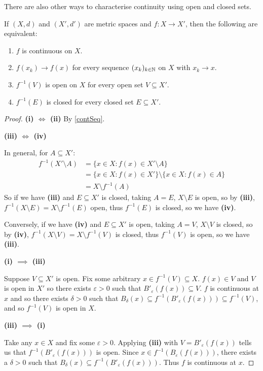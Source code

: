 \documentclass[../main.tex]{subfiles}
\begin{document}
There are also other ways to characterise continuity using open and closed sets.
\begin{theorem}
  If $(X, d)$ and $(X', d')$ are metric spaces and $f: X \to X'$, then the following are equivalent:
  \begin{enumerate}
    \item $f$ is continuous on $X$.
    \item $f(x_k) \to f(x)$ for every sequence $(x_k)_{k \in \mathbb{N}}$ on $X$ with $x_k \to x$.
    \item $f^{-1}(V)$ is open on $X$ for every open set $V \subseteq X'$.
    \item $f^{-1}(E)$ is closed for every closed set $E \subseteq X'$.
  \end{enumerate}
\end{theorem}
\begin{proof}\par
  \textbf{(i) $\iff$ (ii)} By \cref{contSeq}.

  \textbf{(iii) $\iff$ (iv)}\par
  In general, for $A \subseteq X'$:
  \begin{align*}
    f^{-1}(X' \setminus A) &= \{x \in X: f(x) \in X' \setminus A\} \\
                           &= \{x \in X: f(x) \in X'\} \setminus \{x \in X: f(x) \in A\} \\
                           &= X \setminus f^{-1}(A)
  \end{align*}
  So if we have \textbf{(iii)} and $E \subseteq X'$ is closed, taking $A = E$, $X \setminus E$ is open, so by \textbf{(iii)}, $f^{-1}(X \setminus E) = X \setminus f^{-1}(E)$ open, thus $f^{-1}(E)$ is closed, so we have \textbf{(iv)}.

  Conversely, if we have \textbf{(iv)} and $E \subseteq X'$ is open, taking $A = V$, $X \setminus V$ is closed, so by \textbf{(iv)}, $f^{-1}(X \setminus V) = X \setminus f^{-1}(V)$ is closed, thus $f^{-1}(V)$ is open, so we have \textbf{(iii)}.

  \textbf{(i) $\implies$ (iii)}\par
  Suppose $V \subseteq X'$ is open.
  Fix some arbitrary $x \in f^{-1}(V) \subseteq X$.
  $f(x) \in V$ and $V$ is open in $X'$ so there exists $\varepsilon > 0$ such that $B'_{\varepsilon}(f(x)) \subseteq V$.
  $f$ is continuous at $x$ and so there exists $\delta > 0$ such that $B_{\delta}(x) \subseteq f^{-1}(B'_\varepsilon(f(x))) \subseteq f^{-1}(V)$, and so $f^{-1}(V)$ is open in $X$.

  \textbf{(iii) $\implies$ (i)}\par
    Take any $x \in X$ and fix some $\varepsilon > 0$.
    Applying \textbf{(iii)} with $V = B'_{\varepsilon}(f(x))$ tells us that $f^{-1}(B'_{\varepsilon}(f(x)))$ is open.
    Since $x \in f^{-1}(B_{\varepsilon}(f(x)))$, there exists a $\delta > 0$ such that $B_\delta(x) \subseteq f^{-1}(B'_{\varepsilon}(f(x)))$.
    Thus $f$ is continuous at $x$.
\end{proof}
\end{document}
